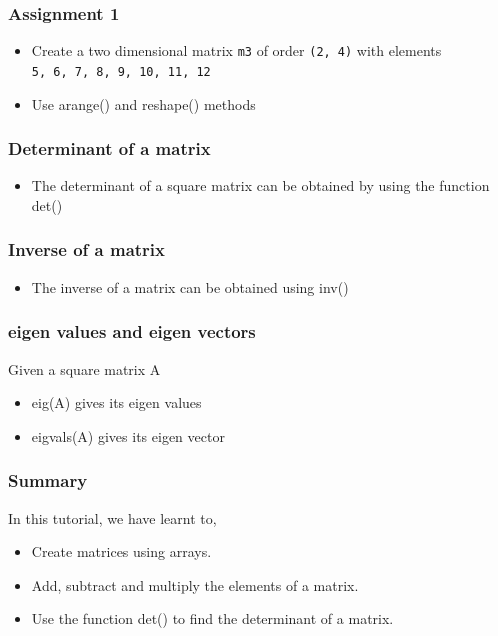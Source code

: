 \documentclass[17pt]{beamer}
\begin{document}
\begin{frame}
\frametitle{Assignment 1}
\label{sec-4}

\begin{itemize}
\item Create a two dimensional matrix \texttt{m3} of order \texttt{(2, 4)} with
   elements \\ \texttt{5, 6, 7, 8, 9, 10, 11, 12}\pause
\item Use arange() and reshape() methods
\end{itemize}

\end{frame}
\begin{frame}
\frametitle{Determinant of a matrix}
\label{sec-4}

\begin{itemize}
\item The determinant of a square matrix can be obtained by using the function det()
\end{itemize}

\end{frame}
\begin{frame}
\frametitle{Inverse of a matrix}
\label{sec-4}

\begin{itemize}

\item The inverse of a matrix can be obtained using inv()
\end{itemize}

\end{frame}
\begin{frame}
\frametitle{eigen values and eigen vectors}
\label{sec-9}

  Given a square matrix A \pause
\begin{itemize}
\item eig(A) gives its eigen values \pause
\item eigvals(A) gives its eigen vector   
\end{itemize}
  
\end{frame}
\begin{frame}
\frametitle{Summary}
\label{sec-11.1}

  In this tutorial, we have learnt to, \pause

\begin{itemize}
\item Create matrices using arrays.\pause
\item Add, subtract and multiply the elements of a matrix. \pause
\item Use the function det() to find the determinant of a matrix.
\end{itemize}
\end{frame}
\end{document}
